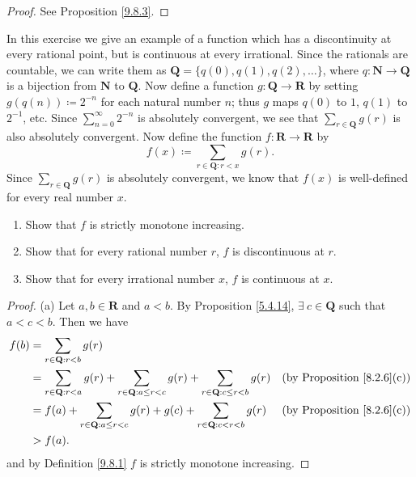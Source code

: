 \begin{proof}
    See Proposition \ref{9.8.3}.
\end{proof}

\begin{exercise}\label{ex 9.8.5}
    In this exercise we give an example of a function which has a discontinuity at every rational point, but is continuous at every irrational.
    Since the rationals are countable, we can write them as \(\mathbf{Q} = \{q(0), q(1), q(2), \dots\}\), where \(q : \mathbf{N} \to \mathbf{Q}\) is a bijection from \(\mathbf{N}\) to \(\mathbf{Q}\).
    Now define a function \(g : \mathbf{Q} \to \mathbf{R}\) by setting \(g(q(n)) \coloneqq 2^{-n}\) for each natural number \(n\);
    thus \(g\) maps \(q(0)\) to \(1\), \(q(1)\) to \(2^{-1}\), etc.
    Since \(\sum_{n = 0}^\infty 2^{-n}\) is absolutely convergent, we see that \(\sum_{r \in \mathbf{Q}} g(r)\) is also absolutely convergent.
    Now define the function \(f : \mathbf{R} \to \mathbf{R}\) by
    \[
        f(x) \coloneqq \sum_{r \in \mathbf{Q} : r < x} g(r).
    \]
    Since \(\sum_{r \in \mathbf{Q}} g(r)\) is absolutely convergent, we know that \(f(x)\) is well-defined for every real number \(x\).
    \begin{enumerate}
        \item Show that \(f\) is strictly monotone increasing.
        \item Show that for every rational number \(r\), \(f\) is discontinuous at \(r\).
        \item Show that for every irrational number \(x\), \(f\) is continuous at \(x\).
    \end{enumerate}
\end{exercise}

\begin{proof}{(a)}
    Let \(a, b \in \mathbf{R}\) and \(a < b\).
    By Proposition \ref{5.4.14}, \(\exists\ c \in \mathbf{Q}\) such that \(a < c < b\).
    Then we have
    \begin{align*}
        f(b) & = \sum_{r \in \mathbf{Q} : r < b} g(r) \\
        & = \sum_{r \in \mathbf{Q} : r < a} g(r) + \sum_{r \in \mathbf{Q} : a \leq r < c} g(r) + \sum_{r \in \mathbf{Q} : c \leq r < b} g(r) & \text{(by Proposition \ref{8.2.6}(c))} \\
        & = f(a) + \sum_{r \in \mathbf{Q} : a \leq r < c} g(r) + g(c) + \sum_{r \in \mathbf{Q} : c < r < b} g(r) & \text{(by Proposition \ref{8.2.6}(c))} \\
        & > f(a).
    \end{align*}
    and by Definition \ref{9.8.1} \(f\) is strictly monotone increasing.
\end{proof}

